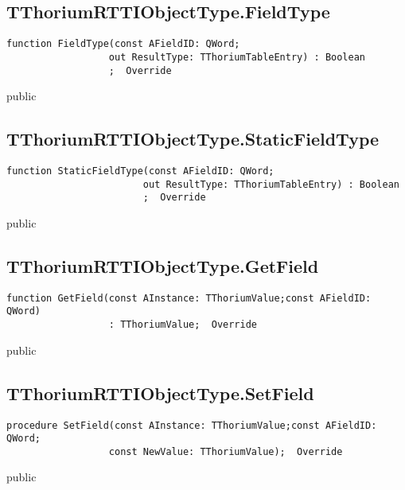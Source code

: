 \subsection{TThoriumRTTIObjectType.FieldType}
\label{thoriumcorepkg:thorium:tthoriumrttiobjecttype:fieldtype}
\begin{FPCList}
\Declaration 

\begin{verbatim}
function FieldType(const AFieldID: QWord;
                  out ResultType: TThoriumTableEntry) : Boolean
                  ;  Override
\end{verbatim}
\Visibility
public
\end{FPCList}
\subsection{TThoriumRTTIObjectType.StaticFieldType}
\label{thoriumcorepkg:thorium:tthoriumrttiobjecttype:staticfieldtype}
\begin{FPCList}
\Declaration 

\begin{verbatim}
function StaticFieldType(const AFieldID: QWord;
                        out ResultType: TThoriumTableEntry) : Boolean
                        ;  Override
\end{verbatim}
\Visibility
public
\end{FPCList}
\subsection{TThoriumRTTIObjectType.GetField}
\label{thoriumcorepkg:thorium:tthoriumrttiobjecttype:getfield}
\begin{FPCList}
\Declaration 

\begin{verbatim}
function GetField(const AInstance: TThoriumValue;const AFieldID: QWord)
                  : TThoriumValue;  Override
\end{verbatim}
\Visibility
public
\end{FPCList}
\subsection{TThoriumRTTIObjectType.SetField}
\label{thoriumcorepkg:thorium:tthoriumrttiobjecttype:setfield}
\begin{FPCList}
\Declaration 

\begin{verbatim}
procedure SetField(const AInstance: TThoriumValue;const AFieldID: QWord;
                  const NewValue: TThoriumValue);  Override
\end{verbatim}
\Visibility
public
\end{FPCList}
